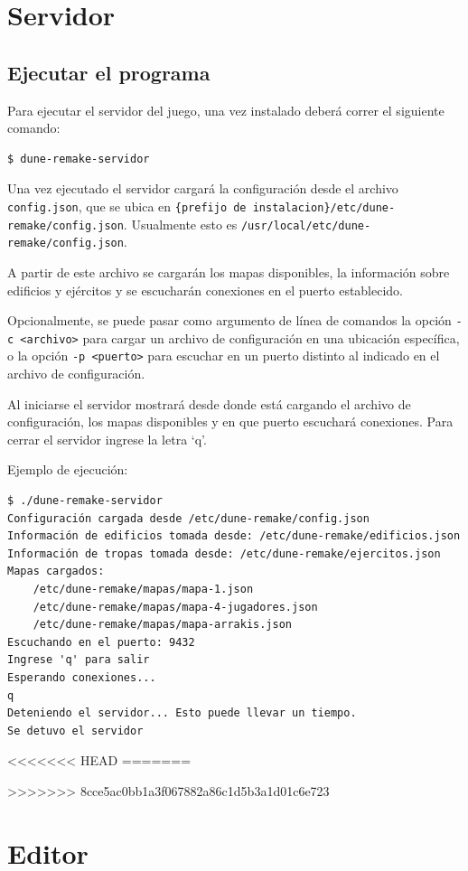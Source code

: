\documentclass[titlepage,a4paper,12pt]{article}
\begin{document}
\newpage
\section{Servidor}

\subsection{Ejecutar el programa}

Para ejecutar el servidor del juego, una vez instalado deberá correr el siguiente comando:
\begin{verbatim}
$ dune-remake-servidor
\end{verbatim}

Una vez ejecutado el servidor cargará la configuración desde el archivo \texttt{config.json}, que se ubica en \texttt{\{prefijo de instalacion\}/etc/dune-remake/config.json}. Usualmente esto es \texttt{/usr/local/etc/dune-remake/config.json}.

A partir de este archivo se cargarán los mapas disponibles, la información sobre edificios y ejércitos y se escucharán conexiones en el puerto establecido.

Opcionalmente, se puede pasar como argumento de línea de comandos la opción \texttt{-c <archivo>} para cargar un archivo de configuración en una ubicación específica, o la opción \texttt{-p <puerto>} para escuchar en un puerto distinto al indicado en el archivo de configuración.

Al iniciarse el servidor mostrará desde donde está cargando el archivo de configuración, los mapas disponibles y en que puerto escuchará conexiones. Para cerrar el servidor ingrese la letra `q'.

Ejemplo de ejecución:
\begin{verbatim}
$ ./dune-remake-servidor
Configuración cargada desde /etc/dune-remake/config.json
Información de edificios tomada desde: /etc/dune-remake/edificios.json
Información de tropas tomada desde: /etc/dune-remake/ejercitos.json
Mapas cargados: 
	/etc/dune-remake/mapas/mapa-1.json
	/etc/dune-remake/mapas/mapa-4-jugadores.json
	/etc/dune-remake/mapas/mapa-arrakis.json
Escuchando en el puerto: 9432
Ingrese 'q' para salir
Esperando conexiones...
q
Deteniendo el servidor... Esto puede llevar un tiempo.
Se detuvo el servidor
\end{verbatim}

<<<<<<< HEAD
=======

>>>>>>> 8cce5ac0bb1a3f067882a86c1d5b3a1d01c6e723
\newpage
\section{Editor}
\end{document}
